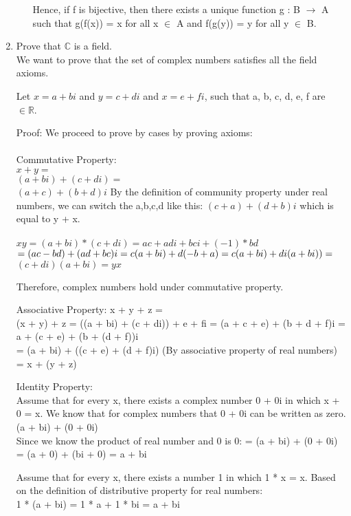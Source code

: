 \documentclass[12pt]{article}
\begin{document}
\begin{enumerate}
\begin{enumerate}[label=(\Alph*)]
            Hence, if f is bijective, then there exists a unique function g : B $\rightarrow$ A such that g(f(x)) = x for all x $\in$ A and f(g(y)) = y for all y $\in$ B. \qedsymbol{} 
        \end{enumerate}
    \item Prove that $\mathbb{C}$ is a field. \\
    We want to prove that the set of complex numbers satisfies all the field axioms. 
    
    Let $x = a + bi$ and $y = c + di$ and $x = e + fi$, such that a, b, c, d, e, f are $\in \mathbb{R}$.

    Proof: We proceed to prove by cases by proving axioms: \\
    \\
    Commutative Property: \\
    $x + y = $ \\
    $(a + bi) + (c + di) =$ \\
    $(a + c) + (b + d)i $
    By the definition of community property under real numbers, we can switch the a,b,c,d like this:
    $(c + a) + (d + b)i$ which is equal to y + x. \\ \\
    
    $xy = (a + bi) * (c + di) = ac + adi + bci + (-1) * bd$
    $= (ac - bd) + (ad + bc)i = c(a + bi) + d(-b + a) = c(a + bi) + di(a + bi)) = \\$
    $(c + di)(a + bi) = yx$

    Therefore, complex numbers hold under commutative property. 

    Associative Property:
    x + y + z = \\
    (x + y) + z = ((a + bi) + (c + di)) + e + fi 
    = (a + c + e) + (b + d + f)i = a + (c + e) + (b + (d + f))i
    \\= (a + bi) + ((c + e) + (d + f)i)   (By associative property of real numbers)
    = x + (y + z) 

    Identity Property:\\
    Assume that for every x, there exists a complex number 0 + 0i in which x + 0 = x.
    We know that for complex numbers that 0 + 0i can be written as zero. 
    (a + bi) + (0 + 0i) \\ Since we know the product of real number and 0 is 0: 
    = (a + bi) + (0 + 0i) = (a + 0) + (bi + 0) = a + bi

    Assume that for every x, there exists a number 1 in which 1 * x = x.
    Based on the definition of distributive property for real numbers: \\
    1 * (a + bi) = 1 * a + 1 * bi = a + bi \\


\end{enumerate}
\end{document}
